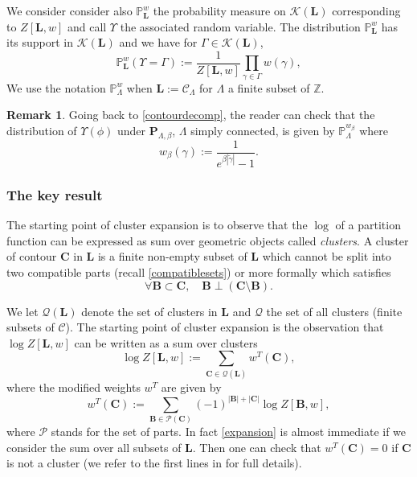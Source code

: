 \documentclass[JEP,XML,SOM,Unicode, NoFloatCountersInSection]{cedram}
\let\mathcal\mathscr
\numberwithin{equation}{section}
\theoremstyle{plain}
\theoremstyle{definition}
\newtheorem{rem}[theorem]{Remark}
\newcommand{\cQ}{{\ensuremath{\mathcal Q}} }
\newcommand{\cP}{{\ensuremath{\mathcal P}} }
\newcommand{\cC}{{\ensuremath{\mathcal C}} }
\newcommand{\cK}{{\ensuremath{\mathcal K}} }
\newcommand{\bP}{{\ensuremath{\mathbf P}} }
\newcommand{\bC}{{\ensuremath{\mathbf C}} }
\newcommand{\bL}{{\ensuremath{\mathbf L}} }
\newcommand{\bB}{{\ensuremath{\mathbf B}} }
\newcommand{\bbP}{{\ensuremath{\mathbb P}} }
\newcommand{\bbZ}{{\ensuremath{\mathbb Z}} }
\newcommand{\gb}{\beta}
\newcommand{\gG}{\Gamma}
\newcommand{\gL}{\Lambda}
\begin{document}
We consider consider also $\bbP^w_{\bL}$ the probability measure on $\cK(\bL)$ corresponding to $Z[\bL,w]$ and call $\Upsilon$ the associated random variable.
The distribution $\bbP^w_{\bL}$ has its support in $\cK(\bL)$ and we have for $\gG\in \cK(\bL)$,
\begin{equation*}%
\bbP^w_{\bL}(\Upsilon=\gG):=\frac{1}{Z[\bL,w]}\prod_{\gamma\in \gG}w(\gamma),
\end{equation*}
We use the notation $\bbP^w_{\gL}$ when $\bL:=\cC_{\gL}$ for $\gL$ a finite subset of $\bbZ$.

\begin{rem}\label{teorema}
Going back to \eqref{contourdecomp}, the reader can check that the distribution of $\Upsilon(\phi)$ under
$\bP_{\gL,\gb}$, $\gL$ simply connected, is given by $\bbP^{w_{\gb}}_\gL$ where
\begin{equation}\label{specialweight}
w_{\gb}(\gamma):=\frac{1}{e^{\gb|\tilde \gamma|}-1}.
\end{equation}
\end{rem}
\subsubsection{The key result}

The starting point of cluster expansion is to observe that the $\log$ of a partition function
can be expressed as sum over geometric objects called \textit{clusters}.
A cluster of contour $\bC$ in $\bL$ is a finite non-empty subset of $\bL$ which cannot be split into two compatible parts (recall \eqref{compatiblesets})
or more formally which satisfies
\begin{equation}\label{noncluster}
\forall \bB \subset \bC, \quad \bB \perp (\bC \setminus \bB).
\end{equation}

We let $\cQ(\bL)$ denote the set of clusters in $\bL$ and $\cQ$ the set of all clusters (finite subsets of $\cC$).
The starting point of cluster expansion is the observation that $\log Z[\bL,w]$ can be written as a sum over clusters
\begin{equation}\label{expansion}
\log Z[\bL,w]:= \sum_{\bC \in \cQ(\bL)} w^T(\bC),
\end{equation}
where the modified weights $w^T$ are given by
\begin{equation*}%
w^T(\bC):= \sum_{\bB\in \cP(\bC)} (-1)^{|\bB|+|\bC|} \log Z[\bB,w],
\end{equation*}
where $\cP$ stands for the set of parts. In fact \eqref{expansion} is almost immediate if we consider the sum over all subsets of $\bL$. Then
one can check that $w^T(\bC)=0$ if $\bC$ is not a cluster (we refer to the first lines in \cite[\S 3]{cf:KP} for full details).
\end{document}
